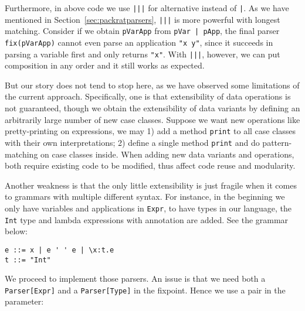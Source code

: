 Furthermore, in above code we use \lstinline{|||} for alternative instead of \lstinline{|}. As we have mentioned in Section~\ref{sec:packratparsers}, \lstinline{|||} is more powerful with longest matching. Consider if we obtain \lstinline{pVarApp} from \lstinline{pVar | pApp}, the final parser \lstinline{fix(pVarApp)} cannot even parse an application \lstinline{"x y"}, since it succeeds in parsing a variable first and only returns \lstinline{"x"}. With \lstinline{|||}, however, we can put composition in any order and it still works as expected.

But our story does not tend to stop here, as we have observed some limitations of the current approach. Specifically, one is that extensibility of data operations is not guaranteed, though we obtain the extensibility of data variants by defining an arbitrarily large number of new case classes. Suppose we want new operations like pretty-printing on expressions, we may 1) add a method \lstinline{print} to all case classes with their own interpretations; 2) define a single method \lstinline{print} and do pattern-matching on case classes inside. When adding new data variants and operations, both require existing code to be modified, thus affect code reuse and modularity.

Another weakness is that the only little extensibility is just fragile when it comes to grammars with multiple different syntax. For instance, in the beginning we only have variables and applications in \lstinline{Expr}, to have types in our language, the \lstinline{Int} type and lambda expressions with annotation are added. See the grammar below:
\begin{lstlisting}
e ::= x | e ' ' e | \x:t.e
t ::= "Int"
\end{lstlisting}

We proceed to implement those parsers. An issue is that we need both a \lstinline{Parser[Expr]} and a \lstinline{Parser[Type]} in the fixpoint.
Hence we use a pair in the parameter:


